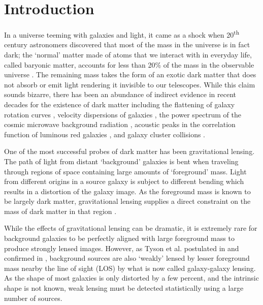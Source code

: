 \documentclass[%
 reprint,
 amsmath,amssymb,
 aps,nofootinbib
]{revtex4-1}
\begin{document}
\maketitle



\section{Introduction}

In a universe teeming with galaxies and light, it came as a shock when 20\textsuperscript{th} century astronomers discovered that most of the mass in the universe is in fact dark; the `normal' matter made of atoms that we interact with in everyday life, called baryonic matter, accounts for less than 20\% of the mass in the observable universe \cite{planck_2015}. The remaining mass takes the form of an exotic dark matter that does not absorb or emit light rendering it invisible to our telescopes. While this claim sounds bizarre, there has been an abundance of indirect evidence in recent decades for the existence of dark matter including the flattening of galaxy rotation curves \cite{rotation_curve}, velocity dispersions of galaxies \cite{zwicky}, the power spectrum of the cosmic microwave background radiation \cite{planck_2015}, acoustic peaks in the correlation function of luminous red galaxies \cite{bao_detection}, and galaxy cluster collisions \cite{bullet_cluster}.

One of the most successful probes of dark matter has been gravitational lensing. The path of light from distant `background' galaxies is bent when traveling through regions of space containing large amounts of `foreground' mass. Light from different origins in a source galaxy is subject to different bending which results in a distortion of the galaxy image. As the foreground mass is known to be largely dark matter, gravitational lensing supplies a direct constraint on the mass of dark matter in that region \cite{dark_matter_probe}.

While the effects of gravitational lensing can be dramatic, it is extremely rare for background galaxies to be perfectly aligned with large foreground mass to produce strongly lensed images. However, as Tyson et al. postulated in \cite{tyson_postulate} and confirmed in \cite{tyson_confirm}, background sources are also `weakly' lensed by lesser foreground mass nearby the line of sight (LOS) by what is now called galaxy-galaxy lensing. As the shape of most galaxies is only distorted by a few percent, and the intrinsic shape is not known, weak lensing must be detected statistically using a large number of sources.
\end{document}
